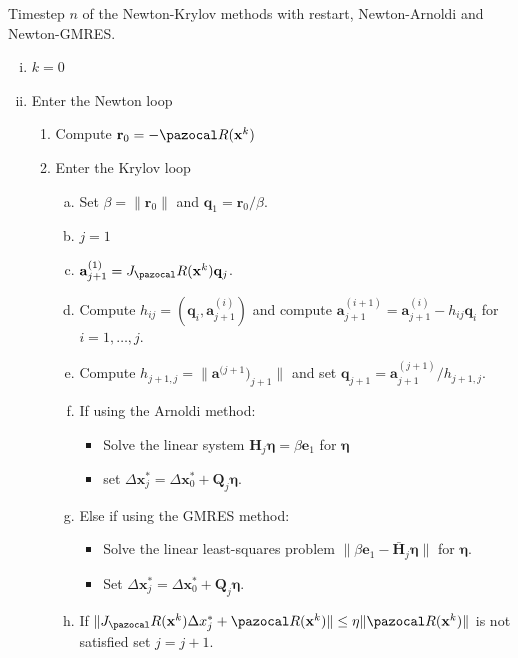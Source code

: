 \begin{framedbox}[htbp]
  \caption{Timestep \(n\) of the Newton-Krylov methods with restart, Newton-Arnoldi and Newton-GMRES.}
  \label{box:newton_krylov}
  \begin{center}
    \begin{minipage}{0.9\textwidth}
    \begin{enumerate}[(i)]
    \item \(k=0\)
    \item Enter the Newton loop
    \begin{enumerate}[(1)]
      \item Compute \(\mathbf r_0 = -\pazocal R(\mathbf x^k)\)
      \item Enter the Krylov loop
      \begin{enumerate}[(a)]
        \item Set \(\beta = \|\mathbf r_0\|\) and \(\mathbf q_1 = \mathbf r_0/\beta\).
        \item \(j=1\)
        \item \(\mathbf a^{(1)}_{j+1} = J_\pazocal R(\mathbf x^k) \mathbf q_j\).
        \item Compute \(h_{ij}=(\mathbf q_i, \mathbf a^{(i)}_{j+1})\) and compute \(\mathbf a^{(i+1)}_{j+1} = \mathbf a^{(i)}_{j+1} - h_{ij} \mathbf q_i\) for \(i=1,\dots,j\).
        \item Compute \(h_{j+1,j}=\|\mathbf a^{(j+1})_{j+1}\|\) and set \(\mathbf q_{j+1} = \mathbf a^{(j+1)}_{j+1}/h_{j+1,j}\).
        \item If using the Arnoldi method:
        \begin{itemize}
          \item Solve the linear system \(\mathbf H_j \boldsymbol{\eta} = \beta \mathbf e_1\) for \(\boldsymbol{\eta}\)
          \item set \(\Delta \mathbf x^*_j  =\Delta \mathbf x^*_0 + \mathbf Q_j\boldsymbol \eta\).
        \end{itemize}
        \item Else if using the GMRES method:
        \begin{itemize}
          \item Solve the linear least-squares problem \(\|\beta\mathbf e_1 -\bar{\mathbf H}_j \boldsymbol{\eta}\|\) for \(\boldsymbol{\eta}\).
          \item Set \(\Delta \mathbf x^*_j  =\Delta \mathbf x^*_0 + \mathbf Q_j\boldsymbol \eta\).
        \end{itemize}
        \item If \(\|J_\pazocal R(\mathbf x^k) \Delta x^*_j+ \pazocal R(\mathbf x^k)\| \leq \eta\|\pazocal R(\mathbf x^k)\|\) is not satisfied set \(j=j+1\).

\end{enumerate}
\end{enumerate}
\end{enumerate}
\end{minipage}
\end{center}
\end{framedbox}
